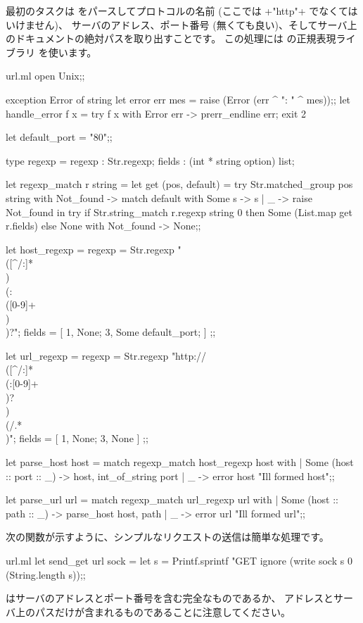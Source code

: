最初のタスクは \URL をパースしてプロトコルの名前 (ここでは \ml+"http"+ でなくてはいけません)、
サーバのアドレス、ポート番号 (無くても良い)、そしてサーバ上のドキュメントの絶対パスを取り出すことです。
この処理には \ocaml の正規表現ライブラリ  を使います。
%
\begin{listingcodefile}{url.ml}
open Unix;;

exception Error of string
let error err mes = raise (Error (err ^ ": " ^ mes));;
let handle_error f x = try f x with Error err -> prerr_endline err; exit 2

let default_port = "80";;

type regexp = { regexp : Str.regexp; fields : (int * string option) list; }

let regexp_match r string =
  let get (pos, default) =
    try Str.matched_group pos string
    with Not_found ->
      match default with Some s -> s | _ -> raise Not_found in
  try
    if Str.string_match r.regexp string 0 then
      Some (List.map get r.fields)
    else None
  with Not_found -> None;;

let host_regexp =
  { regexp = Str.regexp "\\([^/:]*\\)\\(:\\([0-9]+\\)\\)?";
    fields = [ 1, None; 3, Some default_port; ] };;

let url_regexp =
  { regexp = Str.regexp "http://\\([^/:]*\\(:[0-9]+\\)?\\)\\(/.*\\)";
    fields = [ 1, None; 3, None ] };;

let parse_host host = match regexp_match host_regexp host with
  | Some (host :: port :: _) -> host, int_of_string port
  | _ -> error host "Ill formed host";;

let parse_url url = match regexp_match url_regexp url with
  | Some (host :: path :: _) -> parse_host host, path
  | _ -> error url "Ill formed url";;
\end{listingcodefile}
%
次の関数が示すように、シンプルなリクエストの送信は簡単な処理です。
%
\begin{listingcodefile}{url.ml}
let send_get url sock =
  let s = Printf.sprintf "GET %
  ignore (write sock s 0 (String.length s));;
\end{listingcodefile}
%
\URL はサーバのアドレスとポート番号を含む完全なものであるか、
アドレスとサーバ上のパスだけが含まれるものであることに注意してください。

